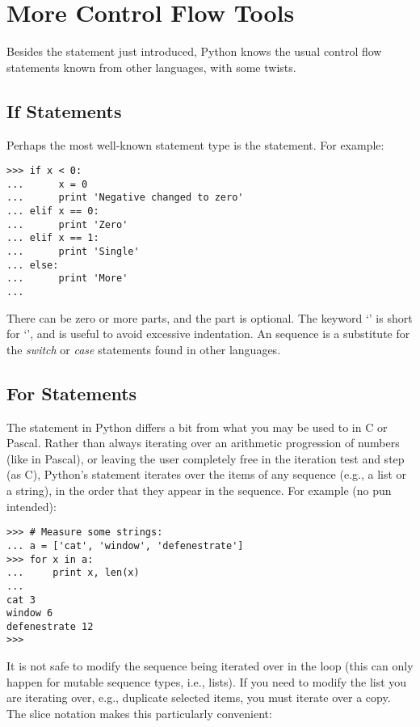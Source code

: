 \chapter{More Control Flow Tools}

Besides the  statement just introduced, Python knows the
usual control flow statements known from other languages, with some
twists.

\section{If Statements}

Perhaps the most well-known statement type is the  statement.
For example:

\bcode\begin{verbatim}
>>> if x < 0:
...      x = 0
...      print 'Negative changed to zero'
... elif x == 0:
...      print 'Zero'
... elif x == 1:
...      print 'Single'
... else:
...      print 'More'
... 
\end{verbatim}\ecode
%
There can be zero or more  parts, and the  part is
optional.  The keyword `' is short for `', and is
useful to avoid excessive indentation.  An 
sequence is a substitute for the \emph{switch} or \emph{case} statements
found in other languages.

\section{For Statements}

The  statement in Python differs a bit from what you may be
used to in C or Pascal.  Rather than always iterating over an
arithmetic progression of numbers (like in Pascal), or leaving the user
completely free in the iteration test and step (as C), Python's
 statement iterates over the items of any sequence (e.g., a
list or a string), in the order that they appear in the sequence.  For 
example (no pun intended):

\bcode\begin{verbatim}
>>> # Measure some strings:
... a = ['cat', 'window', 'defenestrate']
>>> for x in a:
...     print x, len(x)
... 
cat 3
window 6
defenestrate 12
>>> 
\end{verbatim}\ecode
%
It is not safe to modify the sequence being iterated over in the loop
(this can only happen for mutable sequence types, i.e., lists).  If
you need to modify the list you are iterating over, e.g., duplicate
selected items, you must iterate over a copy.  The slice notation
makes this particularly convenient:

